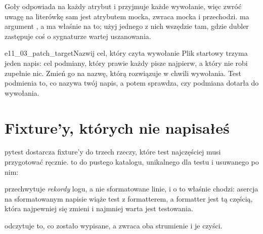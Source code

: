 
\begin{warning}
Goły  odpowiada na każdy atrybut i przyjmuje każde wywołanie, więc
 \dash{} zwróć uwagę na literówkę
\dash{} sam jest atrybutem mocka, zwraca mocka i przechodzi.  ma
argument , a  ma  właśnie na to;
użyj jednego z nich wszędzie tam, gdzie dubler zastępuje coś o sygnaturze
wartej uszanowania.
\end{warning}

\begin{exercise}{e11_03_patch_target}{Nazwij cel, który czyta wywołanie}
Plik startowy trzyma jeden napis: cel podmiany, który prawie każdy pisze
najpierw, a który nie robi zupełnie nic. Zmień go na nazwę, którą
 rozwiązuje w chwili wywołania. Test podmienia to, co
nazywa twój napis, a potem sprawdza, czy podmiana dotarła do wywołania.
\end{exercise}

\section{Fixture'y, których nie napisałeś}
\label{sec:testing-builtin}

pytest dostarcza fixture'y do trzech rzeczy, które test najczęściej musi
przygotować ręcznie.  to  do pustego katalogu,
unikalnego dla testu i usuwanego po nim:


\noindent
{} przechwytuje \emph{rekordy} logu, a nie sformatowane linie, i o
to właśnie chodzi: asercja na sformatowanym napisie wiąże test z
formatterem, a formatter jest tą częścią, która najpewniej się zmieni i
najmniej warta jest testowania.


\noindent
{} odczytuje to, co zostało wypisane, a  zwraca
oba strumienie i je czyści.


